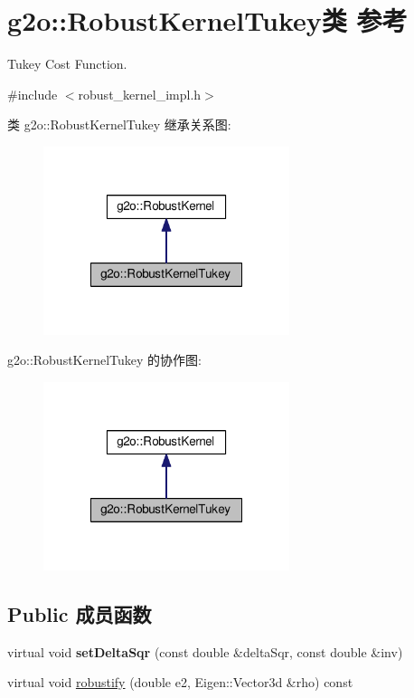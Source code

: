 \hypertarget{classg2o_1_1RobustKernelTukey}{\section{g2o\-:\-:Robust\-Kernel\-Tukey类 参考}
\label{classg2o_1_1RobustKernelTukey}
}


Tukey Cost Function.  




{\ttfamily \#include $<$robust\-\_\-kernel\-\_\-impl.\-h$>$}



类 g2o\-:\-:Robust\-Kernel\-Tukey 继承关系图\-:
\nopagebreak
\begin{figure}[H]
\begin{center}
\leavevmode
\includegraphics[width=204pt]{classg2o_1_1RobustKernelTukey__inherit__graph}
\end{center}
\end{figure}


g2o\-:\-:Robust\-Kernel\-Tukey 的协作图\-:
\nopagebreak
\begin{figure}[H]
\begin{center}
\leavevmode
\includegraphics[width=204pt]{classg2o_1_1RobustKernelTukey__coll__graph}
\end{center}
\end{figure}
\subsection*{Public 成员函数}
\begin{DoxyCompactItemize}
\item 
\hypertarget{classg2o_1_1RobustKernelTukey_a0602ba130364506d65fb86f3473209aa}{virtual void {\bfseries set\-Delta\-Sqr} (const double \&delta\-Sqr, const double \&inv)}\label{classg2o_1_1RobustKernelTukey_a0602ba130364506d65fb86f3473209aa}

\item 
virtual void \hyperlink{classg2o_1_1RobustKernelTukey_abcc5f9921110f775db6d652f8fcf4f42}{robustify} (double e2, Eigen\-::\-Vector3d \&rho) const 
\end{DoxyCompactItemize}

